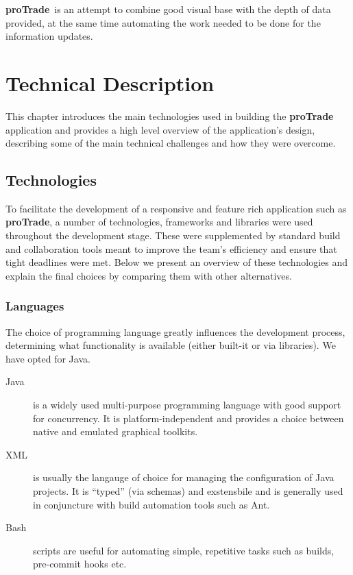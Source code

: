 \documentclass[10pt]{report}
\newcommand{\nm}{{\bf proTrade}}
\newcommand{\nmsp}{{\nm \ }}
\begin{document}
\nmsp is an attempt to combine good visual base with the depth of data provided, at the same time automating the work needed to be done for the 
information updates.

\chapter{Technical Description}

This chapter introduces the main technologies used in building the {\nmsp} application and provides a high level overview of the application's design, describing some of the main technical challenges and how they were overcome.

\section{Technologies}
To facilitate the development of a responsive and feature rich application such as {\nm}, a number of technologies, frameworks and libraries were used throughout the development stage. These were supplemented by standard build and collaboration tools meant to improve the team's efficiency and ensure that tight deadlines were met.
Below we present an overview of these technologies and explain the final choices by comparing them with other alternatives.

\subsection{Languages}

The choice of programming language greatly influences the development process, determining what functionality is available (either built-it or via libraries). We have opted for Java.

\begin{description}
\item[Java] is a widely used multi-purpose programming language with good support for concurrency. It is platform-independent and provides a choice between native and emulated graphical toolkits. 

\item[XML] is usually the langauge of choice for managing the configuration of Java projects. It is ``typed'' (via schemas) and exstensbile and is generally used in conjuncture with build automation tools such as Ant.

\item[Bash] scripts are useful for automating simple, repetitive tasks such as builds, pre-commit hooks etc.

\end{description}
\end{document}
